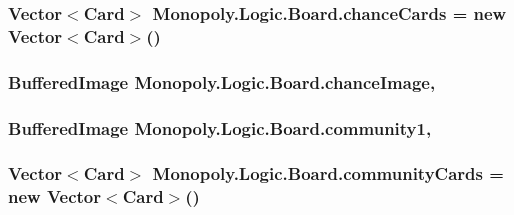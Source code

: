 \subsubsection[{\texorpdfstring{chance\+Cards}{chanceCards}}]{\setlength{\rightskip}{0pt plus 5cm}Vector$<${\bf Card}$>$ Monopoly.\+Logic.\+Board.\+chance\+Cards = new Vector$<${\bf Card}$>$()\hspace{0.3cm}{\ttfamily [private]}}\hypertarget{class_monopoly_1_1_logic_1_1_board_aaebf7a0020990db049c286e5778b0809}{}\label{class_monopoly_1_1_logic_1_1_board_aaebf7a0020990db049c286e5778b0809}
\subsubsection[{\texorpdfstring{chance\+Image}{chanceImage}}]{\setlength{\rightskip}{0pt plus 5cm}Buffered\+Image Monopoly.\+Logic.\+Board.\+chance\+Image\hspace{0.3cm}{\ttfamily [static]}, {\ttfamily [protected]}}\hypertarget{class_monopoly_1_1_logic_1_1_board_adf2202931ca275781b6fa08cb75e4f74}{}\label{class_monopoly_1_1_logic_1_1_board_adf2202931ca275781b6fa08cb75e4f74}
\subsubsection[{\texorpdfstring{community1}{community1}}]{\setlength{\rightskip}{0pt plus 5cm}Buffered\+Image Monopoly.\+Logic.\+Board.\+community1\hspace{0.3cm}{\ttfamily [static]}, {\ttfamily [protected]}}\hypertarget{class_monopoly_1_1_logic_1_1_board_a5cb4d4c2e50425ce6e342d8c35e4ed0f}{}\label{class_monopoly_1_1_logic_1_1_board_a5cb4d4c2e50425ce6e342d8c35e4ed0f}
\subsubsection[{\texorpdfstring{community\+Cards}{communityCards}}]{\setlength{\rightskip}{0pt plus 5cm}Vector$<${\bf Card}$>$ Monopoly.\+Logic.\+Board.\+community\+Cards = new Vector$<${\bf Card}$>$()\hspace{0.3cm}{\ttfamily [private]}}\hypertarget{class_monopoly_1_1_logic_1_1_board_a48b98e8f6f9319826d2faf5ff88172a2}{}\label{class_monopoly_1_1_logic_1_1_board_a48b98e8f6f9319826d2faf5ff88172a2}
